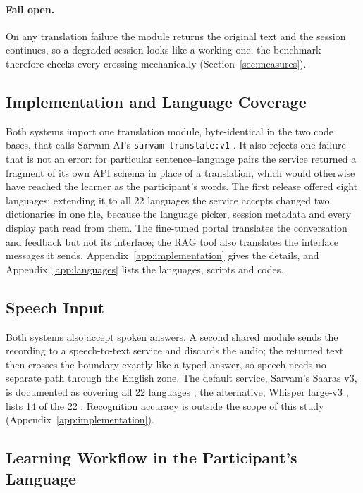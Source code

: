 \documentclass[pdflatex,sn-mathphys-num]{sn-jnl}%
\theoremstyle{thmstyleone}%
\theoremstyle{thmstyletwo}%
\theoremstyle{thmstylethree}%
\begin{document}
\paragraph{Fail open.} On any translation failure the module returns the original text and the
session continues, so a degraded session looks like a working one; the benchmark therefore checks
every crossing mechanically (Section~\ref{sec:measures}).

\subsection{Implementation and Language Coverage}\label{sec:impl}

Both systems import one translation module, byte-identical in the two code bases, that calls Sarvam
AI's \texttt{sarvam-translate:v1} \cite{sarvamtranslate}. It also rejects one failure that is not an
error: for particular sentence--language pairs the service returned a fragment of its own API schema
in place of a translation, which would otherwise have reached the learner as the participant's words.
The first release offered eight languages; extending it to all 22 languages the service accepts
changed two dictionaries in one file, because the language picker, session metadata and every
display path read from them. The fine-tuned portal translates the conversation and feedback but not
its interface; the RAG tool also translates the interface messages it sends. Appendix~\ref{app:implementation}
gives the details, and Appendix~\ref{app:languages} lists the languages, scripts and codes.

\subsection{Speech Input}\label{sec:voice}

Both systems also accept spoken answers. A second shared module sends the recording to a
speech-to-text service and discards the audio; the returned text then crosses the boundary exactly
like a typed answer, so speech needs no separate path through the English zone. The default service,
Sarvam's Saaras v3, is documented as covering all 22 languages \cite{sarvamstt}; the alternative,
Whisper large-v3 \cite{radford2023whisper}, lists 14 of the 22 \cite{whispertokenizer}. Recognition
accuracy is outside the scope of this study (Appendix~\ref{app:implementation}).

\subsection{Learning Workflow in the Participant's Language}\label{sec:workflow}
\end{document}
